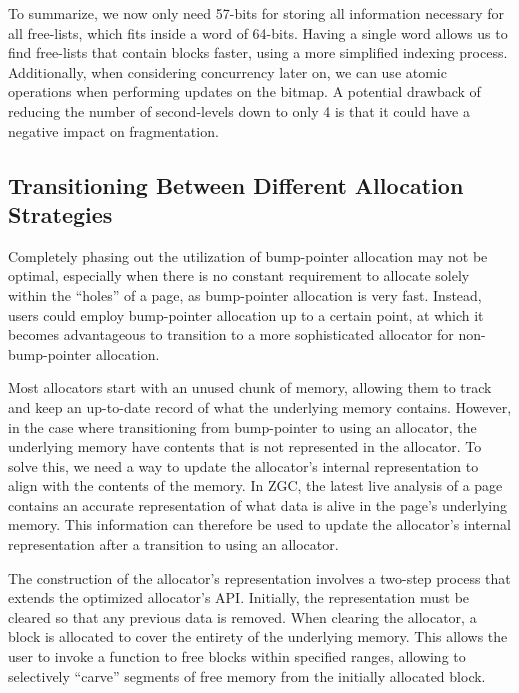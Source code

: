 To summarize, we now only need 57-bits for storing all information necessary for all free-lists, which fits inside a word of 64-bits. Having a single word allows us to find free-lists that contain blocks faster, using a more simplified indexing process. Additionally, when considering concurrency later on, we can use atomic operations when performing updates on the bitmap. A potential drawback of reducing the number of second-levels down to only 4 is that it could have a negative impact on fragmentation.


\subsection{Transitioning Between Different Allocation Strategies}

Completely phasing out the utilization of bump-pointer allocation may not be optimal, especially when there is no constant requirement to allocate solely within the ``holes'' of a page, as bump-pointer allocation is very fast. Instead, users could employ bump-pointer allocation up to a certain point, at which it becomes advantageous to transition to a more sophisticated allocator for non-bump-pointer allocation.

Most allocators start with an unused chunk of memory, allowing them to track and keep an up-to-date record of what the underlying memory contains. However, in the case where transitioning from bump-pointer to using an allocator, the underlying memory have contents that is not represented in the allocator. To solve this, we need a way to update the allocator's internal representation to align with the contents of the memory. In ZGC, the latest live analysis of a page contains an accurate representation of what data is alive in the page's underlying memory. This information can therefore be used to update the allocator's internal representation after a transition to using an allocator.

The construction of the allocator's representation involves a two-step process that extends the optimized allocator's API. Initially, the representation must be cleared so that any previous data is removed. When clearing the allocator, a block is allocated to cover the entirety of the underlying memory. This allows the user to invoke a function to free blocks within specified ranges, allowing to selectively ``carve'' segments of free memory from the initially allocated block.

